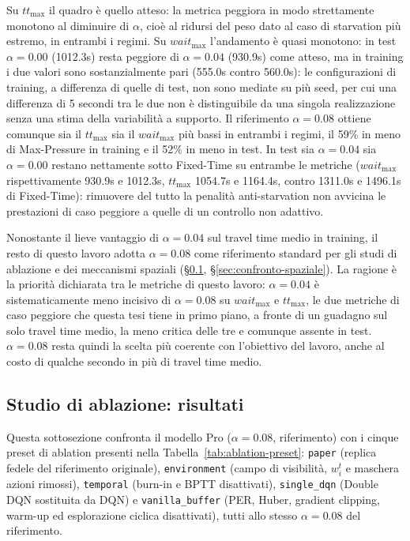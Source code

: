 Su $tt_{\max}$ il quadro è quello atteso: la metrica peggiora in modo
strettamente monotono al diminuire di $\alpha$, cioè al ridursi del peso
dato al caso di starvation più estremo, in entrambi i regimi. Su
$wait_{\max}$ l'andamento è quasi monotono: in test $\alpha=0.00$ (1012.3s)
resta peggiore di $\alpha=0.04$ (930.9s) come atteso, ma in training i due
valori sono sostanzialmente pari (555.0s contro 560.0s): le configurazioni
di training, a differenza di quelle di test, non sono mediate su più
seed, per cui una differenza di 5 secondi tra le due non è distinguibile
da una singola realizzazione senza una stima della variabilità a
supporto. Il
riferimento $\alpha=0.08$ ottiene comunque sia il $tt_{\max}$ sia il
$wait_{\max}$ più bassi in entrambi i regimi, il 59\% in meno
di Max-Pressure in training e il 52\% in meno in test. In test sia $\alpha=0.04$
sia $\alpha=0.00$ restano nettamente sotto Fixed-Time su entrambe le metriche
($wait_{\max}$ rispettivamente 930.9s e 1012.3s, $tt_{\max}$ 1054.7s e 1164.4s,
contro 1311.0s e 1496.1s di Fixed-Time): rimuovere del tutto la
penalità anti-starvation non avvicina le prestazioni di caso peggiore
a quelle di un controllo non adattivo.

Nonostante il lieve vantaggio di $\alpha=0.04$ sul travel time medio in
training, il resto di questo lavoro adotta $\alpha=0.08$ come riferimento
standard per gli studi di ablazione e dei meccanismi spaziali
(§\ref{sec:ablation-risultati}, §\ref{sec:confronto-spaziale}). La ragione
è la priorità dichiarata tra le metriche di questo lavoro:
$\alpha=0.04$ è sistematicamente meno incisivo di
$\alpha=0.08$ su $wait_{\max}$ e $tt_{\max}$, le due metriche di caso peggiore
che questa tesi tiene in primo piano, a fronte di un guadagno sul solo
travel time medio, la meno critica delle tre e comunque assente in test.
$\alpha=0.08$ resta quindi
la scelta più coerente con l'obiettivo del lavoro, anche al costo di
qualche secondo in più di travel time medio.

\subsection{Studio di ablazione: risultati}
\label{sec:ablation-risultati}

Questa sottosezione confronta il modello Pro ($\alpha=0.08$, riferimento)
con i cinque preset di ablation presenti nella Tabella~\ref{tab:ablation-preset}:
\texttt{paper} (replica fedele del riferimento originale), \texttt{environment}
(campo di visibilità, $w_i^t$ e maschera azioni rimossi),
\texttt{temporal} (burn-in e BPTT disattivati), \texttt{single\_dqn}
(Double DQN sostituita da DQN) e \texttt{vanilla\_buffer} (PER, Huber,
gradient clipping, warm-up ed esplorazione ciclica disattivati),
tutti allo stesso $\alpha=0.08$ del riferimento.

